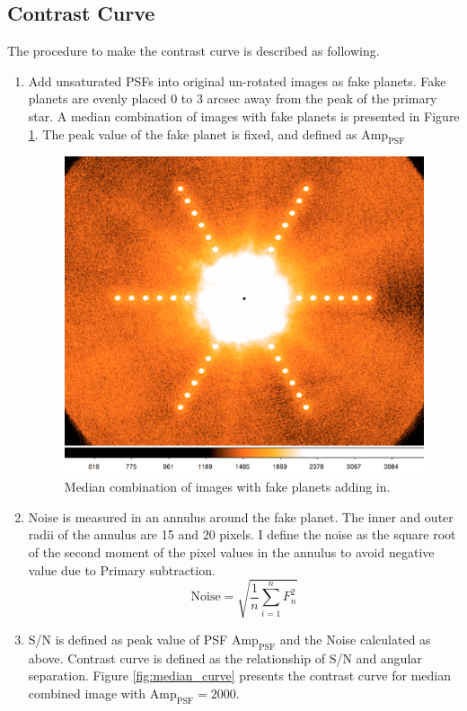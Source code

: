 \documentclass[paper=letter, fontsize=11pt]{scrartcl} %
\numberwithin{equation}{section} %
\numberwithin{figure}{section} %
\numberwithin{table}{section} %
\begin{document}
\subsection{Contrast Curve}
The procedure to make the contrast curve is described as following.
\begin{enumerate}
\item Add unsaturated PSFs  into original un-rotated images as fake
  planets. Fake planets are evenly placed 0 to 3 arcsec away from the
  peak of the primary star. A median combination of images with fake
  planets is presented in Figure \ref{fig:median_fakeplanet}. The peak
  value of the fake planet is fixed, and defined as
  $\mathrm{Amp_{PSF}}$
  
   \begin{figure}
    \centering
    \includegraphics[width=\textwidth]{median_fake}
    \caption{Median combination of images with fake planets adding
      in. }
    \label{fig:median_fakeplanet}
  \end{figure}
 \item Noise is measured in an annulus around the  fake planet. The
   inner and outer radii of the annulus are 15 and 20 pixels. I define
   the noise as the square root of the second moment of the pixel
   values in the annulus to avoid negative value due to Primary
   subtraction.
   \[
     \mathrm{Noise} = \sqrt{\frac{1}{n}\sum_{i=1}^{n}F_{n}^{2}}
     \]
 \item S/N is defined as peak value of PSF   $\mathrm{Amp_{PSF}}$ and
   the Noise calculated as above. Contrast curve is defined as the
   relationship of S/N and angular separation. Figure
   \ref{fig:median_curve} presents the contrast curve for median
   combined image with   $\mathrm{Amp_{PSF}} = 2000$.
 \end{enumerate}
\end{document}
